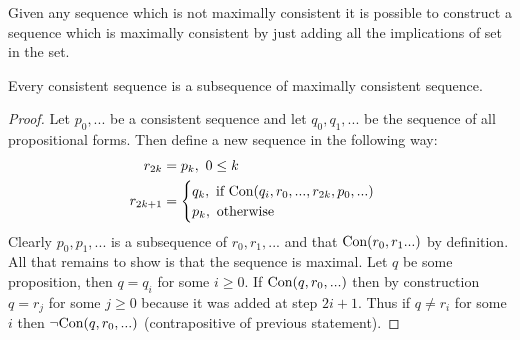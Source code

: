 Given any sequence which is not maximally consistent it is possible to construct a sequence which is maximally consistent by just adding all the implications of set in the set.
\begin{theorem}
  Every consistent sequence is a subsequence of maximally consistent sequence. 
\end{theorem}
\begin{proof}
  Let $p_0,...$ be a consistent sequence and let $q_0,q_1,...$ be the sequence of all propositional forms. Then define a new sequence in the following way:
  \begin{align*}
    r_{2k} &= p_k,\ 0\leq k\\
    r_{2k+1} &= \begin{cases}
      q_k,\ \text{if $\text{Con}(q_i, r_0,...,r_{2k},p_0,...)$}\\
      p_k,\ \text{otherwise}  
    \end{cases}
  \end{align*}
  Clearly $p_0,p_1,...$ is a subsequence of $r_0,r_1,...$ and that $\text{Con}(r_0,r_1...)$ by definition. All that remains to show is that the sequence is maximal. Let $q$ be some proposition, then $q=q_i$ for some $i\geq 0$. If $\text{Con}(q,r_0,...)$ then by construction $q=r_j$ for some $j\geq 0$ because it was added at step $2i+1$. Thus if $q \neq r_i$ for some $i$ then $\lnot \text{Con}(q,r_0,...)$ (contrapositive of previous statement). 
\end{proof}
